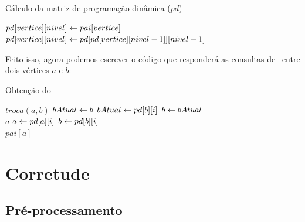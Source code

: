 \vspace{0.2cm}

\begin{algorithm}[H]
\caption{Cálculo da matriz de programação dinâmica ($pd$)}
\begin{algorithmic}[1]
                \State $pd[vertice][nivel] \leftarrow pai[vertice]$
            \Else
                \State $pd[vertice][nivel] \leftarrow pd[pd[vertice][nivel-1]][nivel-1]$
            \EndIf
        \EndFor
    \EndFor
\EndFunction
\end{algorithmic}
\end{algorithm}

Feito isso, agora podemos escrever o código que responderá as consultas de \LCA\ entre dois vértices $a$ e $b$:

\vspace{0.2cm}

\begin{algorithm}[H]
\caption{Obtenção do \LCA}
\begin{algorithmic}[1]
        \State $troca(a, b)$
    \EndIf
    \State $bAtual \leftarrow b$
            \State $bAtual \leftarrow pd[b][i]$
        \EndIf
    \EndFor
    \State $b \leftarrow bAtual$
        \\\hspace{11mm} \Return $a$
    \EndIf
            \State $a \leftarrow pd[a][i]$
            \State $b \leftarrow pd[b][i]$
        \EndIf
    \EndFor
    \\\hspace{5mm} \Return $pai[a]$
\EndFunction
\end{algorithmic}
\end{algorithm}

\vspace{10cm}

\section{Corretude}

\subsection{Pré-processamento}

